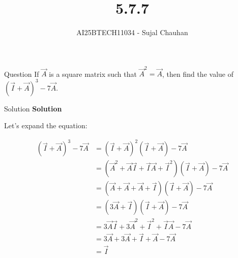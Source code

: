 \documentclass{beamer}
\title{5.7.7}
\author{AI25BTECH11034 - Sujal Chauhan}
\begin{document}
\frame{\titlepage}

\begin{frame}{Question}
If $\Vec{A}$ is a square matrix such that $\Vec{A}^2 = \Vec{A}$, then find the value of $(\Vec{I} + \Vec{A})^3 - 7\Vec{A}$.
\end{frame}

\begin{frame}{Solution}
\textbf{Solution}

Let's expand the equation:

\begin{align*}
    (\Vec{I} + \Vec{A})^3 - 7\Vec{A}
    &= (\Vec{I} + \Vec{A})^2 (\Vec{I} + \Vec{A}) - 7 \Vec{A} \\
    &= (\Vec{A}^2 + \Vec{A}\Vec{I} + \Vec{I}\Vec{A} + \Vec{I}^2) (\Vec{I} + \Vec{A}) - 7\Vec{A} \\
    &= (\Vec{A} + \Vec{A} + \Vec{A} + \Vec{I}) (\Vec{I} + \Vec{A}) - 7\Vec{A} \\
    &= (3\Vec{A} + \Vec{I}) (\Vec{I} + \Vec{A}) - 7\Vec{A} \\
    &= 3\Vec{A}\Vec{I} + 3\Vec{A}^2 + \Vec{I}^2 + \Vec{I}\Vec{A} - 7\Vec{A} \\
    &= 3\Vec{A} + 3\Vec{A} + \Vec{I} + \Vec{A} - 7\Vec{A} \\
    &= \Vec{I}
\end{align*}

\end{frame}
\end{document}
